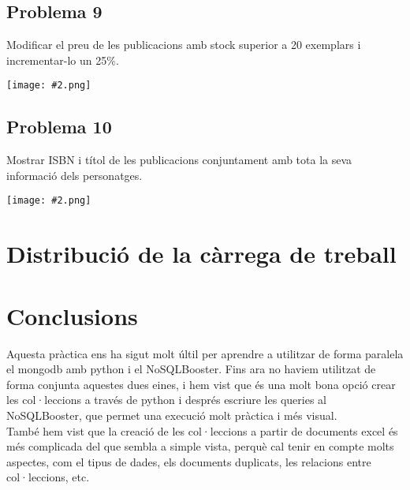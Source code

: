 \documentclass{article}
\newcommand{\imatge}[2]{
\begin{center}
    \texttt{[image: \#2.png]}
\end{center}
}
\begin{document}
\subsection*{Problema 9}
Modificar el preu de les publicacions amb stock superior a 20 exemplars i incrementar-lo un 25\%.
\imatge{1}{9}
\subsection*{Problema 10}
Mostrar ISBN i títol de les publicacions conjuntament amb tota la seva informació dels personatges.
\imatge{1}{10}

\section{Distribuci\'o de la c\`arrega de treball}


\section{Conclusions}
Aquesta pr\`actica ens ha sigut molt \'ultil per aprendre a utilitzar de forma paralela el mongodb amb python i el NoSQLBooster. Fins ara no haviem utilitzat de forma conjunta aquestes dues eines, i hem vist que \'es una molt bona opci\'o crear les col·leccions a trav\'es de python i despr\'es escriure les queries al NoSQLBooster, que permet una execuci\'o molt pr\`actica i m\'es visual.\\
Tamb\'e hem vist que la creaci\'o de les col·leccions a partir de documents excel \'es m\'es complicada del que sembla a simple vista, perqu\`e cal tenir en compte molts aspectes, com el tipus de dades, els documents duplicats, les relacions entre col·leccions, etc.
\end{document}
